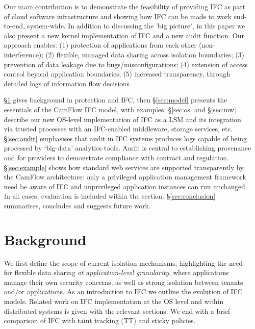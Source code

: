\documentclass[10pt,journal,compsoc]{IEEEtran}
\begin{document}
Our main contribution is to demonstrate the feasibility of providing IFC as part of cloud software infrastructure and showing how IFC can be made to work end-to-end, system-wide. 
In addition to discussing the 'big picture', in this paper we also present a new kernel implementation of IFC and a new audit function. 
Our approach enables:
(1) protection of applications from each other (non-interference); 
(2) flexible, managed data sharing across isolation boundaries;
(3) prevention of data leakage due to bugs/misconfigurations;
(4) extension of access control beyond application boundaries;
(5) increased transparency, through detailed logs of information flow decisions.
			
 

\S\ref{sec:related} gives background in protection and IFC, then 
\S\ref{sec:model} presents the essentials of the CamFlow IFC model, with examples. 
\S\ref{sec:os} and \S\ref{sec:mw} 
describe our new OS-level implementation of IFC as a LSM and its integration via trusted processes with an IFC-enabled middleware, storage services, etc. 
\S\ref{sec:audit} emphasises that audit in IFC systems produces logs capable of being processed by `big-data' analytics tools. Audit is central to establishing provenance and for providers to demonstrate compliance with contract and regulation. 
\S\ref{sec:example} shows how standard web services are supported transparently by the CamFlow architecture: only a privileged application management framework need be aware of IFC and unprivileged application instances can run unchanged. In all cases, evaluation is included within the section. 
\S\ref{sec:conclusion} summarises, concludes and suggests future work.  


 
\section{Background}
\label{sec:related}


We first define the scope of current isolation mechanisms, highlighting the need for flexible data sharing {\em at application-level granularity}, \ie where applications manage their own security concerns, as well as strong isolation between tenants and/or applications.
As an introduction to IFC we outline the evolution of IFC models. Related work on IFC implementation at the OS level and within distributed systems is given with the relevant sections. 
We end with a brief comparison of IFC with taint tracking (TT) and sticky policies.
\end{document}

